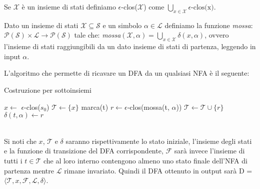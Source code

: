 \begin{remark}
    Se $\mathcal{X}$ è un insieme di stati definiamo $\epsilon$-clos($\mathcal{X}$) come $\bigcup_{x \in \mathcal{X}} \epsilon \mbox{-clos(x)}$.
\end{remark}

\begin{definition}[Mossa]
    Dato un insieme di stati $\mathcal{X} \subseteq \mathcal{S}$ e un simbolo $\alpha \in \mathcal{L}$ definiamo la funzione \emph{mossa}: $\mathcal{P(S)} \times \mathcal{L} \longrightarrow \mathcal{P(S)}$ tale che: \emph{mossa}$(\mathcal{X}, \alpha) = \bigcup_{x \in \mathcal{X}}\delta(x, \alpha)$, ovvero l'insieme di stati raggiungibili da un dato insieme di stati di partenza, leggendo in input $\alpha$.
\end{definition}
\newpage %
L'algoritmo che permette di ricavare un DFA da un qualsiasi NFA è il seguente:
\begin{algorithm}
    \caption{Costruzione per sottoinsiemi}\label{alg:SubsetConstruction_Algorithm}
    \begin{algorithmic}
        \State $x \gets$ $\epsilon$-clos($s_0$) 
        \State $\mathcal{T} \gets \{ x \}$                   
        \State marca(t)
        \State $r \gets \epsilon$-clos(mossa(t, $\alpha$))
        \State $\mathcal{T} \gets \mathcal{T} \cup \{r\}$
        \EndIf
        \State $\delta(t, \alpha) \gets r$  
        \EndFor
        \EndWhile
    \end{algorithmic}
\end{algorithm}\\
Si noti che $x$, $\mathcal{T}$ e $\delta$ saranno rispettivamente lo stato iniziale, l'insieme degli stati e la funzione di transizione del DFA corrispondente, $\mathcal{F}$ sarà invece l'insieme di tutti i $t \in \mathcal{T}$ che al loro interno contengono almeno uno stato finale dell'NFA di partenza mentre $\mathcal{L}$ rimane invariato. Quindi il DFA ottenuto in output sarà D = $\langle \mathcal{T}, x, \mathcal{F}, \mathcal{L}, \delta \rangle$.


